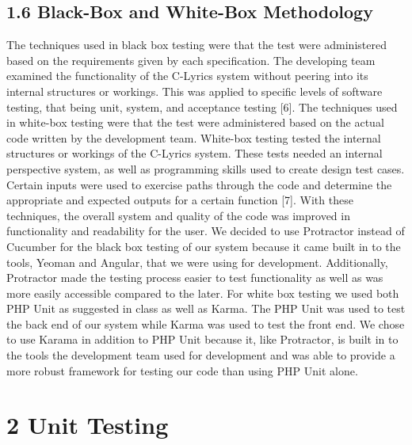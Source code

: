 \documentclass[]{article}
\begin{document}
\subsection{1.6 Black-Box and White-Box
Methodology}\label{black-box-and-white-box-methodology}

The techniques used in black box testing were that the test were
administered based on the requirements given by each specification. The
developing team examined the functionality of the C-Lyrics system
without peering into its internal structures or workings. This was
applied to specific levels of software testing, that being unit, system,
and acceptance testing {[}6{]}. The techniques used in white-box testing
were that the test were administered based on the actual code written by
the development team. White-box testing tested the internal structures
or workings of the C-Lyrics system. These tests needed an internal
perspective system, as well as programming skills used to create design
test cases. Certain inputs were used to exercise paths through the code
and determine the appropriate and expected outputs for a certain
function {[}7{]}. With these techniques, the overall system and quality
of the code was improved in functionality and readability for the user.
We decided to use Protractor instead of Cucumber for the black box
testing of our system because it came built in to the tools, Yeoman and
Angular, that we were using for development. Additionally, Protractor
made the testing process easier to test functionality as well as was
more easily accessible compared to the later. For white box testing we
used both PHP Unit as suggested in class as well as Karma. The PHP Unit
was used to test the back end of our system while Karma was used to test
the front end. We chose to use Karama in addition to PHP Unit because
it, like Protractor, is built in to the tools the development team used
for development and was able to provide a more robust framework for
testing our code than using PHP Unit alone.

\section{2 Unit Testing}\label{unit-testing}
\end{document}
